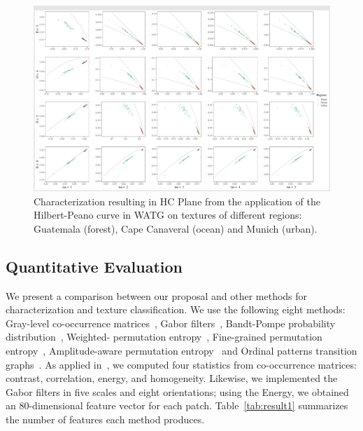 \documentclass[journal]{IEEEtran}
\begin{document}
\begin{figure}
	\centering
	\includegraphics[width=1\textwidth]{Figures/WATGHC.pdf}
	\caption{Characterization resulting in HC Plane from the application of the Hilbert-Peano curve in WATG on textures of different regions: Guatemala (forest), Cape Canaveral (ocean) and Munich (urban).}
	\label{fig:Regions}
\end{figure}

\subsection{Quantitative Evaluation}

We present a comparison between our proposal and other methods for characterization and texture classification.
We use the following eight methods: 
Gray-level co-occurrence matrices~\cite{kourgli2012texture}, 
Gabor filters~\cite{weldon1996efficient},  
Bandt-Pompe probability distribution~\cite{Bandt2002Permutation}, 
Weighted- permutation entropy~\cite{Fadlallah2013Weightedpermutation},
Fine-grained permutation entropy~\cite{xiao2009fine}, 
Amplitude-aware permutation entropy~\cite{azami2016amplitude} and 
Ordinal patterns transition graphs~\cite{Borges2019Transition}.
As applied in~\cite{guan2019covariance}, 
we computed four statistics from co-occurrence matrices: contrast, correlation, energy, and homogeneity.
Likewise, we implemented the Gabor filters in five scales and eight orientations; using the Energy, we obtained an $80$-dimensional feature vector for each patch.
Table~\ref{tab:result1} summarizes the number of features each method produces.
\end{document}
